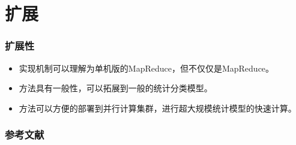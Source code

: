 \documentclass[10pt]{beamer}
\begin{document}
\section{扩展}

\begin{frame}
  \frametitle{扩展性}

  \begin{itemize}

  \item 实现机制可以理解为单机版的MapReduce，但不仅仅是MapReduce。

  \item 方法具有一般性，可以拓展到一般的统计分类模型。
  \item 方法可以方便的部署到并行计算集群，进行超大规模统计模型的快速计算。

  \end{itemize}

\end{frame}

  \begin{frame}
    \frametitle{参考文献}

    \def\newblock{\hskip .11em plus .33em minus .07em} %
    
    

  \end{frame}


\begin{frame}


  \begin{center}
   \color{blue}{\Huge 谢谢！}
  \end{center}


\end{frame}
\end{document}

